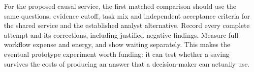 For the proposed causal service, the first matched comparison should use
the same questions, evidence cutoff, task mix and independent acceptance
criteria for the shared service and the established analyst alternative.
Record every complete attempt and its corrections, including justified
negative findings. Measure full-workflow expense and energy, and show
waiting separately. This makes the eventual prototype experiment worth
funding: it can test whether a saving survives the costs of producing an
answer that a decision-maker can actually use.
